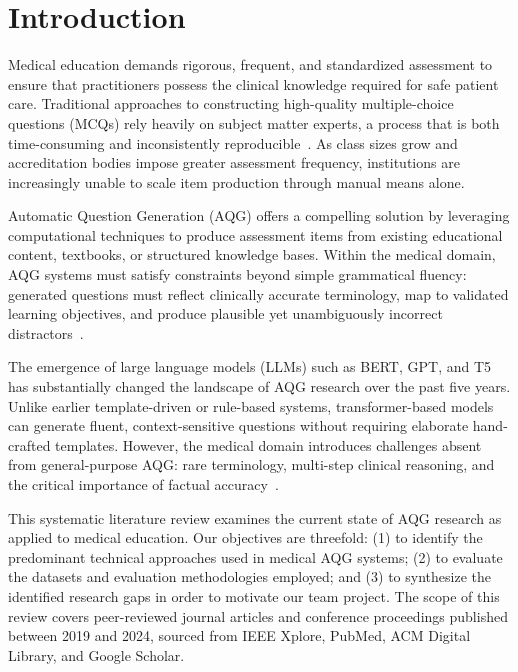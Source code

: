 \documentclass[conference]{IEEEtran}
\begin{document}
\section{Introduction}

Medical education demands rigorous, frequent, and standardized assessment to ensure that practitioners possess the clinical knowledge required for safe patient care. Traditional approaches to constructing high-quality multiple-choice questions (MCQs) rely heavily on subject matter experts, a process that is both time-consuming and inconsistently reproducible~\cite{leo2019ontology}. As class sizes grow and accreditation bodies impose greater assessment frequency, institutions are increasingly unable to scale item production through manual means alone.

Automatic Question Generation (AQG) offers a compelling solution by leveraging computational techniques to produce assessment items from existing educational content, textbooks, or structured knowledge bases. Within the medical domain, AQG systems must satisfy constraints beyond simple grammatical fluency: generated questions must reflect clinically accurate terminology, map to validated learning objectives, and produce plausible yet unambiguously incorrect distractors~\cite{kurdi2020systematic}.

The emergence of large language models (LLMs) such as BERT, GPT, and T5 has substantially changed the landscape of AQG research over the past five years. Unlike earlier template-driven or rule-based systems, transformer-based models can generate fluent, context-sensitive questions without requiring elaborate hand-crafted templates. However, the medical domain introduces challenges absent from general-purpose AQG: rare terminology, multi-step clinical reasoning, and the critical importance of factual accuracy~\cite{ghanem2022medical}.

This systematic literature review examines the current state of AQG research as applied to medical education. Our objectives are threefold: (1) to identify the predominant technical approaches used in medical AQG systems; (2) to evaluate the datasets and evaluation methodologies employed; and (3) to synthesize the identified research gaps in order to motivate our team project. The scope of this review covers peer-reviewed journal articles and conference proceedings published between 2019 and 2024, sourced from IEEE Xplore, PubMed, ACM Digital Library, and Google Scholar.
\end{document}
